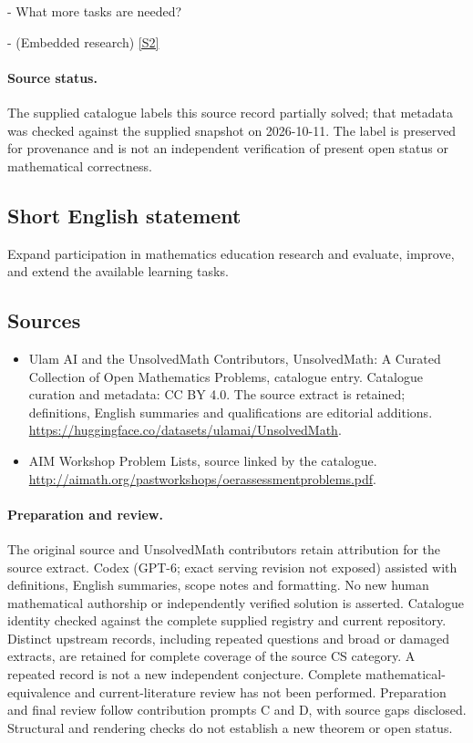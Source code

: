 \documentclass[11pt]{article}
\newcommand{\sref}[2]{\hyperlink{source:#1:#2}{[S#2]}}
\begin{document}
- What more tasks are needed?

- (Embedded research) \sref{statement}{2}
\paragraph{Source status.}
The supplied catalogue labels this source record partially solved; that metadata was checked against the supplied snapshot on 2026-10-11. The label is preserved for provenance and is not an independent verification of present open status or mathematical correctness.
\subsection{Short English statement}
Expand participation in mathematics education research and evaluate, improve, and extend the available learning tasks.
\subsection{Sources}
\begin{itemize}
\item[\hypertarget{source:statement:1}{S1}] Ulam AI and the UnsolvedMath Contributors, UnsolvedMath: A Curated Collection of Open Mathematics Problems, catalogue entry. Catalogue curation and metadata: CC BY 4.0. The source extract is retained; definitions, English summaries and qualifications are editorial additions.
\url{https://huggingface.co/datasets/ulamai/UnsolvedMath}.
\item[\hypertarget{source:statement:2}{S2}] AIM Workshop Problem Lists, source linked by the catalogue.
\url{http://aimath.org/pastworkshops/oerassessmentproblems.pdf}.
\end{itemize}
\paragraph{Preparation and review.}
The original source and UnsolvedMath contributors retain attribution for the source extract. Codex (GPT-6; exact serving revision not exposed) assisted with definitions, English summaries, scope notes and formatting. No new human mathematical authorship or independently verified solution is asserted. Catalogue identity checked against the complete supplied registry and current repository. Distinct upstream records, including repeated questions and broad or damaged extracts, are retained for complete coverage of the source CS category. A repeated record is not a new independent conjecture. Complete mathematical-equivalence and current-literature review has not been performed. Preparation and final review follow contribution prompts C and D, with source gaps disclosed. Structural and rendering checks do not establish a new theorem or open status.
\label{end:statement}
\end{document}

